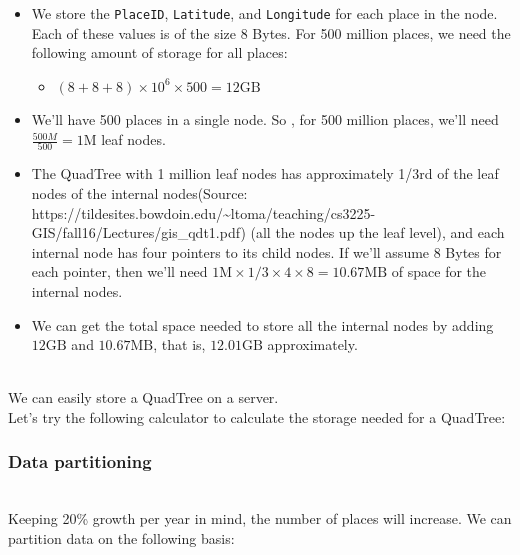 \begin{itemize}
\item
\protect{}\label{u0-jBfVOI42BzTsAKzmdo}
We store the \texttt{PlaceID}, \texttt{Latitude}, and \texttt{Longitude} for each place in the node. Each of these values is of the size 8 Bytes. For 500 million places, we need the following amount of storage for all places:

\begin{itemize}
\item
\protect{}\label{katex_inline_p6foB0GuGhYpa8p-oHMwe}{{{\((8+8+8)\times10^6 \times 500 = 12 \text{GB}\)}}}
\end{itemize}
\item
\protect{}\label{mtpNteq0kVTOijSf6WCFS}
We'll have 500 places in a single node. So , for 500 million places, we'll need \protect{}\label{katex_inline__T2aWrZ-wcLwOt0nf_Xo6}{{{\(\frac{500M}{500} = 1 \text{M}\)}}} leaf nodes.
\item
\protect{}\label{S0XmhStgPkOKbZP-nI6hE}
The QuadTree with 1 million leaf nodes has approximately 1/3rd of the leaf nodes of the internal nodes(Source: https://tildesites.bowdoin.edu/\textasciitilde ltoma/teaching/cs3225-GIS/fall16/Lectures/gis\_qdt1.pdf) (all the nodes up the leaf level), and each internal node has four pointers to its child nodes. If we'll assume 8 Bytes for each pointer, then we'll need \protect{}\label{katex_inline_IVc1xn0PR2ysNU8VtbnPn}{{{\(1\text{M} \times 1/3 \times 4 \times 8 = 10.67 \text{MB}\)}}} of space for the internal nodes.
\item
\protect{}\label{iNkvYPyzxwf58AKd8dVVr}
We can get the total space needed to store all the internal nodes by adding \protect{}\label{katex_inline_GzbAQ1tP9qtfrzlwr_slg}{{{\(12\text{GB}\)}}} and \protect{}\label{katex_inline_hdNQudHhr-66AdAO-Z0C8}{{{\(10.67\text{MB}\)}}}, that is, \protect{}\label{katex_inline_vnRt_-qvBV1geOQtNqJZ6}{{{\(12.01\text{GB}\)}}} approximately.
\end{itemize}
\\
We can easily store a QuadTree on a server.
\\
Let's try the following calculator to calculate the storage needed for a QuadTree:


\subsubsection{Data partitioning}\label{lxMhyCwWsV4igX8T2BBm9}
\\
Keeping 20\% growth per year in mind, the number of places will increase. We can partition data on the following basis:


